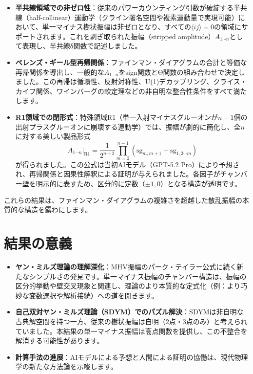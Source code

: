 \documentclass[dvipdfmx,a4paper]{jsbook}
\theoremstyle{definition}
\theoremstyle{remark}
\begin{document}
\begin{itemize}
  \item \textbf{半共線領域での非ゼロ性}：従来のパワーカウンティング引数が破綻する半共線（half-collinear）運動学（クライン署名空間や複素運動量で実現可能）において、単一マイナス樹状振幅は非ゼロとなり、すべての$\langle ij \rangle = 0$の領域にサポートされます。これを剥ぎ取られた振幅（stripped amplitude）$A_{1\cdots n}$として表現し、半共線δ関数で記述しました。
  
  \item \textbf{ベレンズ・ギール型再帰関係}：ファインマン・ダイアグラムの合計と等価な再帰関係を導出し、一般的な$A_{1\cdots n}$をsign関数とΘ関数の組み合わせで決定しました。この再帰は循環性、反射対称性、U(1)デカップリング、クライス・カイフ関係、ワインバーグの軟定理などの非自明な整合性条件をすべて満たします。
  
  \item \textbf{R1領域での閉形式}：特殊領域R1（単一入射マイナスグルーオンが$n-1$個の出射プラスグルーオンに崩壊する運動学）では、振幅が劇的に簡化し、全$n$に対する美しい製品形式
  \[
  A_{1\cdots n}|_{\text{R1}} = \frac{1}{2^{n-2}} \prod_{m=2}^{n-1} \left( \mathrm{sg}_{m,m+1} + \mathrm{sg}_{1,2\cdots m} \right)
  \]
  が得られました。この公式は当初AIモデル（GPT-5.2 Pro）により予想され、再帰関係と因果性解釈による証明が与えられました。各因子がチャンバー壁を明示的に表すため、区分的に定数（$\pm 1, 0$）となる構造が透明です。
\end{itemize}

これらの結果は、ファインマン・ダイアグラムの複雑さを超越した散乱振幅の本質的な構造を露わにします。

\section{結果の意義}

\begin{itemize}
  \item \textbf{ヤン・ミルズ理論の理解深化}：MHV振幅のパーク・テイラー公式に続く新たなシンプルさの発見です。単一マイナス振幅のチャンバー構造は、振幅の区分的挙動や壁交叉現象と関連し、理論のより本質的な定式化（例：より巧妙な変数選択や解析接続）への道を開きます。
  
  \item \textbf{自己双対ヤン・ミルズ理論（SDYM）でのパズル解決}：SDYMは非自明な古典解空間を持つ一方、従来の樹状振幅は自明（2点・3点のみ）と考えられていました。本結果の単一マイナス振幅は高点関数を提供し、この不整合を解消する可能性があります。
  
  \item \textbf{計算手法の進展}：AIモデルによる予想と人間による証明の協働は、現代物理学の新たな方法論を示唆します。
\end{itemize}
\end{document}
